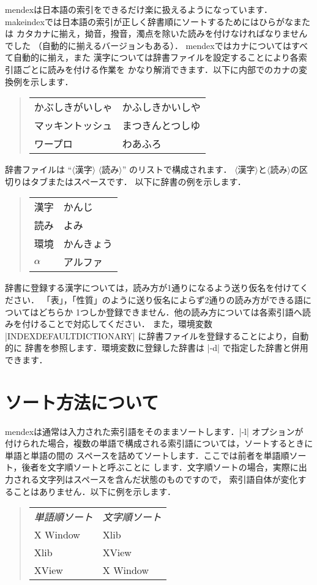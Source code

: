 \documentclass[a4paper]{jsarticle}
\newcommand{\SoftName}[1]{\textsf{#1}}
\newcommand{\jMeta}[1]{$\langle$\mbox{}\textsf{#1}\mbox{}$\rangle$}
\begin{document}
\SoftName{mendex}は日本語の索引をできるだけ楽に扱えるようになっています．
\SoftName{makeindex}では日本語の索引が正しく辞書順にソートするためにはひらがなまたは
カタカナに揃え，拗音，撥音，濁点を除いた読みを付けなければなりませんでした
（自動的に揃えるバージョンもある）． mendexではカナについてはすべて自動的に揃え，また
漢字については辞書ファイルを設定することにより各索引語ごとに読みを付ける作業を
かなり解消できます．以下に内部でのカナの変換例を示します．
%
\begin{quote}
\begin{tabular}{ll}
かぶしきがいしゃ & かふしきかいしや \\
マッキントッシュ & まつきんとつしゆ \\
ワープロ & わあふろ
\end{tabular}
\end{quote}

辞書ファイルは ``\jMeta{漢字} \jMeta{読み}'' のリストで構成されます．
\jMeta{漢字}と\jMeta{読み}の区切りはタブまたはスペースです． 以下に辞書の例を示します．
%
\begin{quote}
\begin{tabular}{ll}
漢字 & かんじ \\
読み & よみ \\
環境 & かんきょう \\
$\alpha$ & アルファ
\end{tabular}
\end{quote}

辞書に登録する漢字については，読み方が1通りになるよう送り仮名を付けてください．
「表」，「性質」のように送り仮名によらず2通りの読み方ができる語についてはどちらか
1つしか登録できません．他の読み方については各索引語へ読みを付けることで対応してください．
また，環境変数 |INDEXDEFAULTDICTIONARY| に辞書ファイルを登録することにより，自動的に
辞書を参照します．環境変数に登録した辞書は |-d| で指定した辞書と併用できます．

\section{ソート方法について}

\SoftName{mendex}は通常は入力された索引語をそのままソートします．|-l| オプションが
付けられた場合，複数の単語で構成される索引語については，ソートするときに単語と単語の間の
スペースを詰めてソートします．ここでは前者を単語順ソート，後者を文字順ソートと呼ぶことに
します．文字順ソートの場合，実際に出力される文字列はスペースを含んだ状態のものですので，
索引語自体が変化することはありません．以下に例を示します．
%
\begin{quote}
\begin{tabular}{ll}
\emph{単語順ソート} & \emph{文字順ソート} \\
X Window & Xlib \\
Xlib & XView \\
XView & X Window
\end{tabular}
\end{quote}
\end{document}
